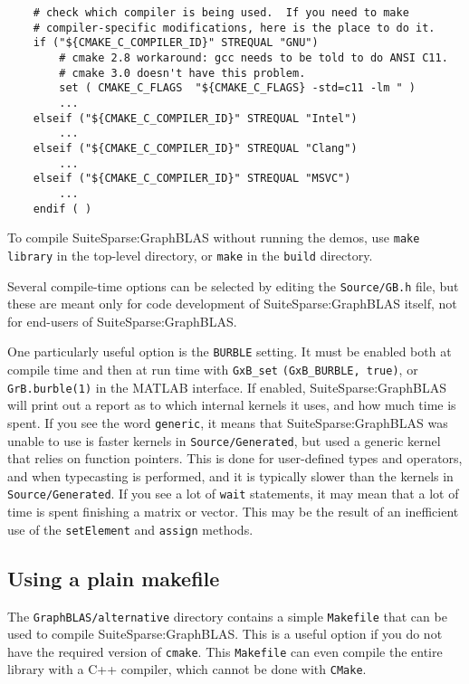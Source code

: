 \documentclass[12pt]{article}
\begin{document}
    {\small
    \begin{verbatim}
    # check which compiler is being used.  If you need to make
    # compiler-specific modifications, here is the place to do it.
    if ("${CMAKE_C_COMPILER_ID}" STREQUAL "GNU")
        # cmake 2.8 workaround: gcc needs to be told to do ANSI C11.
        # cmake 3.0 doesn't have this problem.
        set ( CMAKE_C_FLAGS  "${CMAKE_C_FLAGS} -std=c11 -lm " )
        ...
    elseif ("${CMAKE_C_COMPILER_ID}" STREQUAL "Intel")
        ...
    elseif ("${CMAKE_C_COMPILER_ID}" STREQUAL "Clang")
        ...
    elseif ("${CMAKE_C_COMPILER_ID}" STREQUAL "MSVC")
        ...
    endif ( )
    \end{verbatim} }

To compile SuiteSparse:GraphBLAS without running the demos, use \newline
\verb'make library' in the top-level directory, or \verb'make' in the
\verb'build' directory.

Several compile-time options can be selected by editing the \verb'Source/GB.h'
file, but these are meant only for code development of SuiteSparse:GraphBLAS
itself, not for end-users of SuiteSparse:GraphBLAS.

One particularly useful option is the \verb'BURBLE' setting.  It must be
enabled both at compile time and then at run time with \verb'GxB_set'
\verb'(GxB_BURBLE, true)', or \verb'GrB.burble(1)' in the MATLAB interface.  If
enabled, SuiteSparse:GraphBLAS will print out a report as to which internal
kernels it uses, and how much time is spent.  If you see the word
\verb'generic', it means that SuiteSparse:GraphBLAS was unable to use is faster
kernels in \verb'Source/Generated', but used a generic kernel that relies on
function pointers.  This is done for user-defined types and operators, and when
typecasting is performed, and it is typically slower than the kernels in
\verb'Source/Generated'.  If you see a lot of \verb'wait' statements, it may
mean that a lot of time is spent finishing a matrix or vector.  This may be
the result of an inefficient use of the \verb'setElement' and \verb'assign'
methods.

\subsection{Using a plain makefile}

The \verb'GraphBLAS/alternative' directory contains a simple \verb'Makefile'
that can be used to compile SuiteSparse:GraphBLAS.  This is a useful option
if you do not have the required version of \verb'cmake'.  This \verb'Makefile'
can even compile the entire library with a C++ compiler, which cannot be
done with \verb'CMake'.
\end{document}
